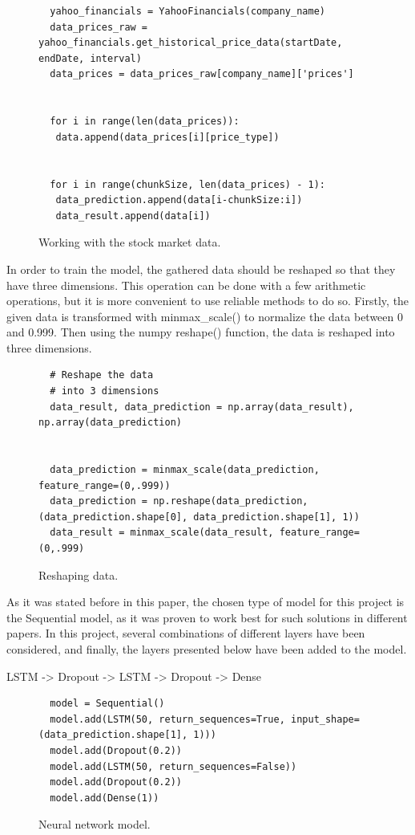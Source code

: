 \begin{figure}
\centering
\begin{lstlisting}
  yahoo_financials = YahooFinancials(company_name)
  data_prices_raw = yahoo_financials.get_historical_price_data(startDate, endDate, interval)
  data_prices = data_prices_raw[company_name]['prices']
  
  
  for i in range(len(data_prices)):
   data.append(data_prices[i][price_type])
  
  
  for i in range(chunkSize, len(data_prices) - 1):
   data_prediction.append(data[i-chunkSize:i])
   data_result.append(data[i])
\end{lstlisting}
\caption{Working with the stock market data.}
\label{fig:pseudocode:listings}
\end{figure}

\clearpage
In order to train the model, the gathered data should be reshaped so that they have three dimensions. This operation can be done with a few arithmetic operations, but it is more convenient to use reliable methods to do so. Firstly, the given data is transformed with minmax{\_}scale() to normalize the data between 0 and 0.999. Then using the numpy reshape() function, the data is reshaped into three dimensions.

\begin{figure}
\centering
\begin{lstlisting}
  # Reshape the data
  # into 3 dimensions
  data_result, data_prediction = np.array(data_result), np.array(data_prediction)
  
  
  data_prediction = minmax_scale(data_prediction, feature_range=(0,.999))
  data_prediction = np.reshape(data_prediction, (data_prediction.shape[0], data_prediction.shape[1], 1))
  data_result = minmax_scale(data_result, feature_range=(0,.999)
\end{lstlisting}
\caption{Reshaping data.}
\label{fig:pseudocode:listings}
\end{figure}

\clearpage
As it was stated before in this paper, the chosen type of model for this project is the Sequential model, as it was proven to work best for such solutions in different papers. In this project, several combinations of different layers have been considered, and finally, the layers presented below have been added to the model.
\par

LSTM -> Dropout -> LSTM -> Dropout -> Dense

\begin{figure}
\centering
\begin{lstlisting}
  model = Sequential()
  model.add(LSTM(50, return_sequences=True, input_shape=(data_prediction.shape[1], 1)))
  model.add(Dropout(0.2))
  model.add(LSTM(50, return_sequences=False))
  model.add(Dropout(0.2))
  model.add(Dense(1))
\end{lstlisting}
\caption{Neural network model.}
\label{fig:pseudocode:listings}
\end{figure}

